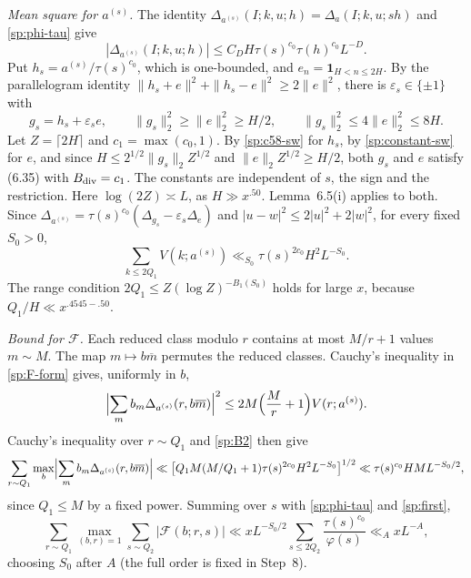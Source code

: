 \emph{Mean square for $a^{(s)}$.} The identity
$\Delta_{a^{(s)}}(I;k,u;h)=\Delta_a(I;k,u;sh)$ and \eqref{sp:phi-tau} give
\[
 |\Delta_{a^{(s)}}(I;k,u;h)|\le C_DH\tau(s)^{c_0}\tau(h)^{c_0}L^{-D}.
\]
Put
$h_s=a^{(s)}/\tau(s)^{c_0}$, which is one-bounded, and
$e_n=\mathbf1_{H<n\le2H}$. By the parallelogram identity
$\|h_s+e\|^2+\|h_s-e\|^2\ge2\|e\|^2$, there is $\varepsilon_s\in\{\pm1\}$
with
\[
 g_s=h_s+\varepsilon_se,\qquad \|g_s\|_2^2\ge\|e\|_2^2\ge H/2,\qquad
 \|g_s\|_2^2\le4\|e\|_2^2\le8H .
\]
Let $Z=\lceil2H\rceil$ and $c_1=\max(c_0,1)$. By \eqref{sp:c58-sw} for
$h_s$, by \eqref{sp:constant-sw} for $e$, and since
$H\le2^{1/2}\|g_s\|_2Z^{1/2}$ and $\|e\|_2Z^{1/2}\ge H/2$, both $g_s$ and $e$
satisfy (6.35) with $B_{\rm div}=c_1$. The constants are independent of $s$,
the sign and the restriction. Here $\log(2Z)\asymp L$, as
$H\gg x^{.50}$. Lemma~6.5(i) applies to both. Since
$\Delta_{a^{(s)}}=\tau(s)^{c_0}(\Delta_{g_s}-\varepsilon_s\Delta_e)$ and
$|u-w|^2\le2|u|^2+2|w|^2$, for every fixed $S_0>0$,
\begin{equation}\label{sp:B2}
 \sum_{k\le2Q_1}V(k;a^{(s)})\ll_{S_0}\tau(s)^{2c_0}H^2L^{-S_0}.
\end{equation}
The range condition $2Q_1\le Z(\log Z)^{-B_1(S_0)}$ holds for large $x$,
because $Q_1/H\ll x^{.4545-.50}$.

\emph{Bound for $\mathcal F$.} Each reduced class modulo $r$ contains at
most $M/r+1$ values $m\sim M$. The map $m\mapsto b\overline m$ permutes the
reduced classes. Cauchy's inequality in \eqref{sp:F-form} gives, uniformly
in $b$,
\[
 \Bigl|\sum_{m}b_m\Delta_{a^{(s)}}(r,b\overline m)\Bigr|^2
 \le2M\Bigl(\frac Mr+1\Bigr)V(r;a^{(s)}).
\]
Cauchy's inequality over $r\sim Q_1$ and \eqref{sp:B2} then give
\[
 \sum_{r\sim Q_1}\max_b\Bigl|\sum_{m}b_m\Delta_{a^{(s)}}(r,b\overline m)\Bigr|
 \ll\bigl[Q_1M(M/Q_1+1)\tau(s)^{2c_0}H^2L^{-S_0}\bigr]^{1/2}
 \ll\tau(s)^{c_0}HML^{-S_0/2},
\]
since $Q_1\le M$ by a fixed power. Summing over $s$ with
\eqref{sp:phi-tau} and \eqref{sp:first},
\begin{equation}\label{sp:E0}
 \sum_{r\sim Q_1}\max_{(b,r)=1}\sum_{s\sim Q_2}|\mathcal F(b;r,s)|
 \ll xL^{-S_0/2}\sum_{s\le2Q_2}\frac{\tau(s)^{c_0}}{\varphi(s)}
 \ll_A xL^{-A},
\end{equation}
choosing $S_0$ after $A$ (the full order is fixed in Step~8).

